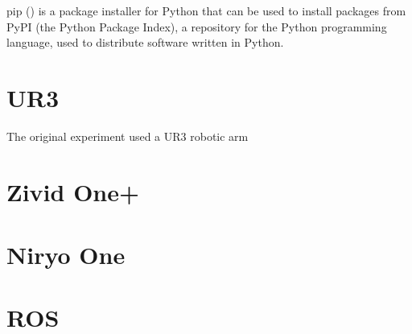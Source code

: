 pip (\cite{pip2021}) is a package installer for Python that can be used to install packages from PyPI (the Python Package Index), a repository for the Python programming language, used to distribute software written in Python.

\section{UR3}

The original experiment used a UR3 robotic arm





\section{Zivid One+}

\section{Niryo One}

\section{ROS}

